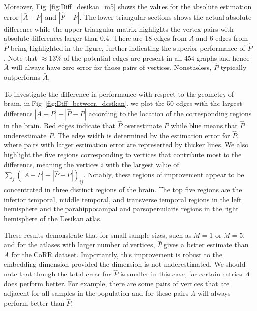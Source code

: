 \documentclass[10pt,letterpaper]{article}
\begin{document}
Moreover, Fig~\ref{fig:Diff_desikan_m5} shows the values for the absolute estimation error $|\bar{A} - P|$ and $|\hat{P}-P|$. The lower triangular sections shows the actual absolute difference while the upper triangular matrix highlights the vertex pairs with absolute differences larger than 0.4. 
There are 18 edges from $\bar{A}$ and 6 edges from $\hat{P}$ being highlighted in the figure, further indicating the superior performance of $\hat{P}$.
Note that $\approx 13\%$ of the potential edges are present in all $454$ graphs and hence $\bar{A}$ will always have zero error for those pairs of vertices.
Nonetheless, $\hat{P}$ typically outperforms $\bar{A}$.

To investigate the difference in performance with respect to the geometry of brain, 
in Fig~\ref{fig:Diff_between_desikan}, we plot the 50 edges with the largest difference $|\bar{A} - P| - |\hat{P} - P|$ according to the location of the corresponding regions in the brain. Red edges indicate that $\hat{P}$ overestimate $P$ while blue means that $\hat{P}$ underestimate $P$. The edge width is determined by the estimation error for $\hat{P}$, where pairs with larger estimation error are represented by thicker lines.
We also highlight the five regions corresponding to vertices that contribute most to the difference, meaning the vertices $i$ with the largest value of $\sum_j (|\bar{A} - P| - |\hat{P} - P|)_{ij}$.
Notably, these regions of improvement appear to be concentrated in three distinct regions of the brain. 
The top five regions are the inferior temporal, middle temporal, and transverse temporal regions in the left hemisphere and the parahippocampal and parsopercularis regions in the right hemisphere of the Desikan atlas.

These results demonstrate that for small sample sizes, such as $M=1$ or $M=5$, and for the atlases with larger number of vertices, $\hat{P}$ gives a better estimate than $\bar{A}$ for the CoRR dataset.
Importantly, this improvement is robust to the embedding dimension provided the dimension is not underestimated.
We should note that though the total error for $\hat{P}$ is smaller in this case, for certain entries $\bar{A}$ does perform better.
For example, there are some pairs of vertices that are adjacent for all samples in the population and for these pairs $\bar{A}$ will always perform better than $\hat{P}$. 
\end{document}
